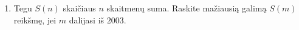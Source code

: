 \begin{enumerate}
  \item \text{[Vietnam 2004]} Tegu $S(n)$ skaičiaus $n$ skaitmenų suma.
    Raskite mažiausią galimą $S(m)$ reikšmę, jei $m$ dalijasi iš $2003$.
 \end{enumerate}

\newpage

